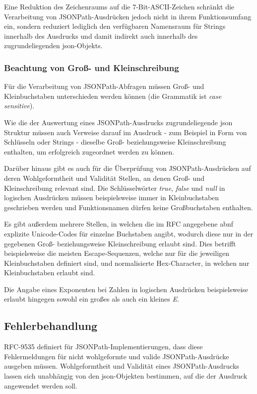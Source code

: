 \documentclass[oneside]{ausarbeitung}
\begin{document}
Eine Reduktion des Zeichenraums auf die 7-Bit-ASCII-Zeichen schränkt die Verarbeitung von JSONPath-Ausdrücken jedoch nicht in ihrem Funktionsumfang ein, sondern reduziert lediglich den verfügbaren Namensraum für Strings innerhalb des Ausdrucks und damit indirekt auch innerhalb des zugrundeliegenden \ac{json}-Objekts. 
	
\subsubsection{Beachtung von Groß- und Kleinschreibung}
	
Für die Verarbeitung von JSONPath-Abfragen müssen Groß- und Kleinbuchstaben unterschieden werden können (die Grammatik ist \textit{case sensitive}). 
	
Wie die der Auswertung eines JSONPath-Ausdrucks zugrundeliegende \ac{json} Struktur müssen auch Verweise darauf im Ausdruck - zum Beispiel in Form von Schlüsseln oder Strings - dieselbe Groß- beziehungsweise Kleinschreibung enthalten, um erfolgreich zugeordnet werden zu können. 
	
Darüber hinaus gibt es auch für die Überprüfung von JSONPath-Ausdrücken auf deren Wohlgeformtheit und Validität Stellen, an denen Groß- und Kleinschreibung relevant sind. Die Schlüsselwörter \textit{true}, \textit{false} und \textit{null} in logischen Ausdrücken müssen beispielsweise immer in Kleinbuchstaben geschrieben werden und Funktionsnamen dürfen keine Großbuchstaben enthalten.
	
Es gibt außerdem mehrere Stellen, in welchen die im RFC angegebene \ac{abnf} explizite Unicode-Codes für einzelne Buchstaben angibt, wodurch diese nur in der gegebenen Groß- beziehungsweise Kleinschreibung erlaubt sind. Dies betrifft beispielsweise die meisten Escape-Sequenzen, welche nur für die jeweiligen Kleinbuchstaben definiert sind, und normalisierte Hex-Character, in welchen nur Kleinbuchstaben erlaubt sind.
	
Die Angabe eines Exponenten bei Zahlen in logischen Ausdrücken beispielsweise erlaubt hingegen sowohl ein großes als auch ein kleines \textit{E}. 
	
	
	
\subsection{Fehlerbehandlung}
	
RFC-9535 definiert für JSONPath-Implementierungen, dass diese Fehlermeldungen für nicht wohlgeformte und valide JSONPath-Ausdrücke ausgeben müssen. Wohlgeformtheit und Validität eines JSONPath-Ausdrucks lassen sich unabhängig von den \ac{json}-Objekten bestimmen, auf die der Ausdruck angewendet werden soll. 
	
\end{document}
